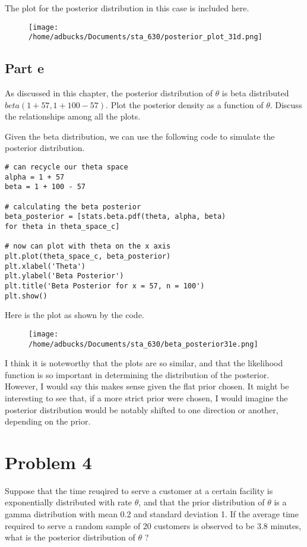 \documentclass[12pt, letterpaper]{article}
\begin{document}
The plot for the posterior distribution in this case is included here. 

\begin{figure} 
\texttt{[image: /home/adbucks/Documents/sta\_630/posterior\_plot\_31d.png]}
\end{figure} 

\subsection{Part e} 

As discussed in this chapter, the posterior distribution of $\theta$ is beta distributed $beta(1 + 57, 1 + 100 - 57)$. Plot the posterior density as a function of $\theta$. Discuss the relationships among all the plots. 

Given the beta distribution, we can use the following code to simulate the posterior distribution. 

\begin{verbatim}
# can recycle our theta space 
alpha = 1 + 57 
beta = 1 + 100 - 57 

# calculating the beta posterior 
beta_posterior = [stats.beta.pdf(theta, alpha, beta) 
for theta in theta_space_c]

# now can plot with theta on the x axis 
plt.plot(theta_space_c, beta_posterior) 
plt.xlabel('Theta') 
plt.ylabel('Beta Posterior') 
plt.title('Beta Posterior for x = 57, n = 100') 
plt.show() 
\end{verbatim} 

Here is the plot as shown by the code. 

\begin{figure} 
\texttt{[image: /home/adbucks/Documents/sta\_630/beta\_posterior31e.png]}
\end{figure} 

I think it is noteworthy that the plots are so similar, and that the likelihood function is so important in determining the distribution of the posterior. However, I would say this makes sense given the flat prior chosen. It might be interesting to see that, if a more strict prior were chosen, I would imagine the posterior distribution would be notably shifted to one direction or another, depending on the prior. 

\section{Problem 4} 

Suppose that the time reuqired to serve a customer at a certain facility is exponentially distributed with rate $\theta$, and that the prior distribution of $\theta$ is a gamma distribution with mean 0.2 and standard deviation 1. If the average time required to serve a random sample of 20 customers is observed to be 3.8 minutes, what is the posterior distribution of $\theta$ ?
\end{document}
